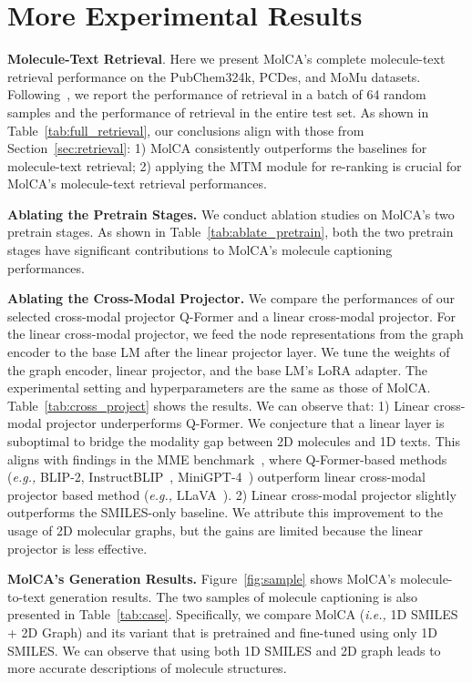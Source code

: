 \documentclass[11pt]{article}
\newcommand{\ie}{\emph{i.e., }}
\newcommand{\eg}{\emph{e.g., }}
\begin{document}
\section{More Experimental Results}
\label{app:experiment}

\textbf{Molecule-Text Retrieval}. Here we present MolCA's complete molecule-text retrieval performance on the PubChem324k, PCDes, and MoMu datasets. Following~\cite{MoMu}, we report the performance of retrieval in a batch of 64 random samples and the performance of retrieval in the entire test set. As shown in Table~\ref{tab:full_retrieval}, our conclusions align with those from Section~\ref{sec:retrieval}: 1) MolCA consistently outperforms the baselines for molecule-text retrieval; 2) applying the MTM module for re-ranking is crucial for MolCA's molecule-text retrieval performances.


\textbf{Ablating the Pretrain Stages.} We conduct ablation studies on MolCA's two pretrain stages. As shown in Table~\ref{tab:ablate_pretrain}, both the two pretrain stages have significant contributions to MolCA's molecule captioning performances.


\textbf{Ablating the Cross-Modal Projector.} We compare the performances of our selected cross-modal projector Q-Former and a linear cross-modal projector. For the linear cross-modal projector, we feed the node representations from the graph encoder to the base LM after the linear projector layer. We tune the weights of the graph encoder, linear projector, and the base LM's LoRA adapter. The experimental setting and hyperparameters are the same as those of MolCA. Table~\ref{tab:cross_project} shows the results. We can observe that: 1) Linear cross-modal projector underperforms Q-Former. We conjecture that a linear layer is suboptimal to bridge the modality gap between 2D molecules and 1D texts. This aligns with findings in the MME benchmark~\cite{MME}, where Q-Former-based methods (\eg BLIP-2, InstructBLIP~\cite{instructblip}, MiniGPT-4~\cite{minigpt4}) outperform linear cross-modal projector based method (\eg LLaVA~\cite{llava}). 2) Linear cross-modal projector slightly outperforms the SMILES-only baseline. We attribute this improvement to the usage of 2D molecular graphs, but the gains are limited because the linear projector is less effective.


\textbf{MolCA's Generation Results.} Figure~\ref{fig:sample} shows MolCA's molecule-to-text generation results. The two samples of molecule captioning is also presented in Table~\ref{tab:case}. Specifically, we compare MolCA (\ie 1D SMILES + 2D Graph) and its variant that is pretrained and fine-tuned using only 1D SMILES. We can observe that using both 1D SMILES and 2D graph leads to more accurate descriptions of molecule structures. 
\end{document}
